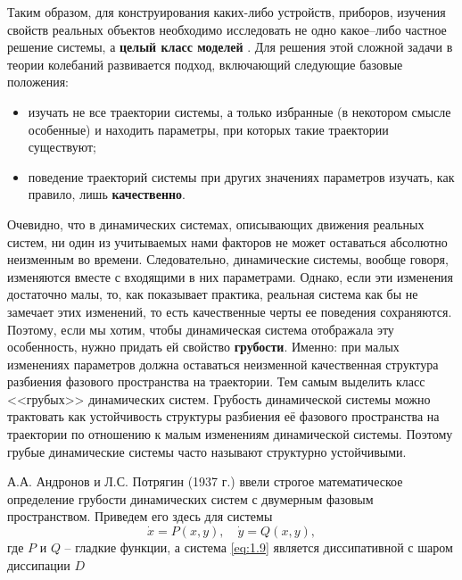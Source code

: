 Таким образом, для конструирования каких-либо устройств, приборов,
изучения свойств реальных объектов необходимо исследовать не одно какое–либо частное решение системы, а \textbf{целый класс моделей} . Для решения этой
сложной задачи в теории колебаний развивается подход, включающий
следующие базовые положения:
\begin{itemize}
	\item изучать не все траектории системы, а только избранные (в некотором смысле особенные) и находить параметры, при которых такие траектории существуют;
	\item поведение траекторий системы при других значениях параметров изучать, как правило, лишь \textbf{качественно}. 
\end{itemize}

Очевидно, что в динамических системах, описывающих движения
реальных систем, ни один из учитываемых нами факторов не может оставаться абсолютно неизменным во времени. Следовательно, динамические системы, вообще говоря, изменяются вместе с входящими в них параметрами. Однако, если эти изменения достаточно малы, то, как показывает практика, реальная
система как бы не замечает этих изменений, то есть качественные черты ее поведения сохраняются. Поэтому, если мы хотим, чтобы динамическая система отображала эту особенность, нужно придать ей свойство \textbf{грубости}. Именно: при малых изменениях параметров должна оставаться неизменной качественная структура разбиения фазового пространства на траектории. Тем самым выделить класс <<грубых>> динамических систем. Грубость динамической
системы можно трактовать как устойчивость структуры разбиения её фазового пространства на траектории по отношению к малым изменениям динамической
системы. Поэтому грубые динамические системы часто называют структурно устойчивыми.

А.А. Андронов и Л.С. Потрягин (1937 г.) ввели строгое математическое определение грубости динамических систем с двумерным фазовым пространством. Приведем его здесь для системы
\begin{equation}
	\label{eq:1.9}
	\dot x = P(x,y), \quad \dot y = Q(x,y),
\end{equation}
где $P$ и $Q$ -- гладкие функции, а система \eqref{eq:1.9} является диссипативной с шаром диссипации $D$

